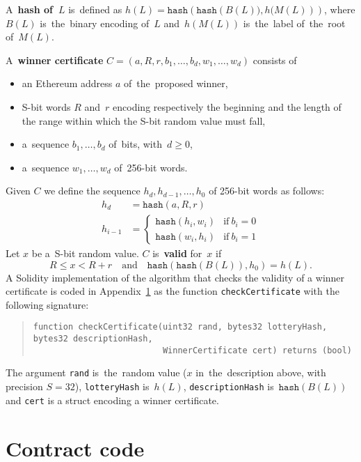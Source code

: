 \documentclass[a4paper]{article}
\newcommand{\hash}[1]{\mathtt{hash}({#1})}
\newcommand{\lotteryhash}[1]{h({#1})}
\begin{document}
    A~\textbf{hash of~$L$} is~defined as $h(L) = \hash{\hash{B(L)), h(M(L)}}$, where $B(L)$ is~the~binary encoding of~$L$
    and~$h(M(L))$ is~the~label of~the~root of~$M(L)$.

    A~\textbf{winner certificate} $C = (a, R, r, b_1, \ldots, b_d, w_1, \ldots, w_d)$ consists of
    \begin{itemize}
    \item an Ethereum address $a$ of~the~proposed winner,
    \item S-bit words $R$ and~$r$ encoding respectively the beginning and the length of
      the range within which the S-bit random value must fall,
    \item a~sequence $b_1, \ldots, b_d$ of~bits, with~$d \geq 0$,
    \item a~sequence $w_1, \ldots, w_d$ of~256-bit words.
    \end{itemize}
    Given $C$ we define the sequence $h_d, h_{d-1}, \ldots, h_0$ of 256-bit words as follows:
    \begin{align*}
      h_d    &= \hash{a, R, r} \\
      h_{i-1} &= \begin{cases}
        \hash{h_i, w_i} &\text{if}\ b_i = 0\\
        \hash{w_i, h_i} &\text{if}\ b_i = 1
      \end{cases}
    \end{align*}
    Let $x$ be a~S-bit random value. $C$ is~\textbf{valid} for~$x$ if
    \begin{displaymath}
      R \leq x < R + r  \quad\text{and}\quad \hash{\hash{B(L)}, h_0} = h(L).
    \end{displaymath}
    A Solidity implementation of the algorithm that checks the validity of a winner certificate is
    coded in Appendix~\ref{sec:code} as the function \verb!checkCertificate! with the following signature:
    \begin{quote}
      \verb|function checkCertificate(uint32 rand, bytes32 lotteryHash, bytes32 descriptionHash,|\\
      \verb|                          WinnerCertificate cert) returns (bool)|
    \end{quote}
    The argument \verb|rand| is~the~random value ($x$ in~the~description above, with precision $S = 32$),
    \verb|lotteryHash| is~$\lotteryhash{L}$, \verb|descriptionHash| is~$\hash{B(L)}$ and \verb|cert| is
    a struct encoding a winner certificate.

\section{Contract code}
\label{sec:code}
\end{document}
